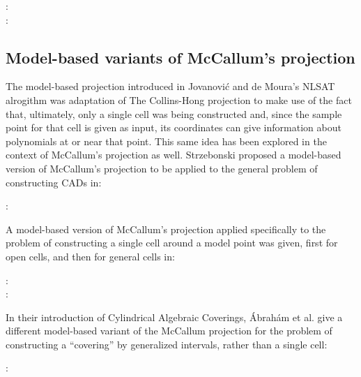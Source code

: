 \documentclass{article}
\begin{document}
%
\begin{description}
\item[\autocite{BrownMcCallum:05} :]  
\item[\autocite{BrownMcCallum:09} :]  
\end{description}
%


\subsection{Model-based variants of McCallum's projection}
The model-based projection introduced in
Jovanovi\'c and de Moura's NLSAT alrogithm was adaptation of
The Collins-Hong projection to make use of the fact that, ultimately,
only a single cell was being constructed and, since the sample point
for that cell is given as input, its coordinates can give information
about polynomials at or near that point.
This same idea has been explored in the context of McCallum's
projection as well.  Strzebonski proposed a model-based version of
McCallum's projection to be applied to the general problem of
constructing CADs in:
%
\begin{description}
\item[\autocite{Strzebonski:2014} :]  
\end{description}
%
A model-based version of McCallum's projection applied specifically to
the problem of constructing a single cell around a model point was
given, first for open cells, and then for general cells in:
\begin{description}
\item[\autocite{Brown:2013} :]  
\item[\autocite{BrownKosta:2014} :]  
\end{description}
%
In their introduction of Cylindrical Algebraic Coverings,
{\'A}brah{\'a}m et al. give a different model-based variant of the
McCallum projection for the problem of constructing a ``covering'' by
generalized intervals, rather than a single cell:
\begin{description}
\item[\autocite{AbrahamEtAl:2021} :]  
\end{description}
%
\end{document}
